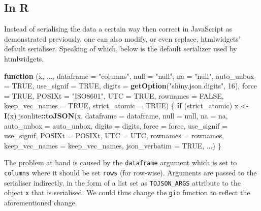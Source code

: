 \documentclass[
]{krantz}
\makeatletter
\newenvironment{Shaded}{\begin{snugshade}}{\end{snugshade}}
\newcommand{\ControlFlowTok}[1]{\textcolor[rgb]{0.27,0.27,0.27}{\textbf{#1}}}
\newcommand{\DataTypeTok}[1]{\textcolor[rgb]{0.27,0.27,0.27}{#1}}
\newcommand{\DecValTok}[1]{\textcolor[rgb]{0.06,0.06,0.06}{#1}}
\newcommand{\KeywordTok}[1]{\textcolor[rgb]{0.27,0.27,0.27}{\textbf{#1}}}
\newcommand{\NormalTok}[1]{#1}
\newcommand{\OperatorTok}[1]{\textcolor[rgb]{0.43,0.43,0.43}{\textbf{#1}}}
\newcommand{\OtherTok}[1]{\textcolor[rgb]{0.37,0.37,0.37}{#1}}
\newcommand{\StringTok}[1]{\textcolor[rgb]{0.5,0.5,0.5}{#1}}
\newenvironment{kframe}{%
\medskip{}
\setlength{\fboxsep}{.8em}
 \def\at@end@of@kframe{}%
 \ifinner\ifhmode%
  \def\at@end@of@kframe{\end{minipage}}%
  \begin{minipage}{\columnwidth}%
 \fi\fi%
 \def\FrameCommand##1{\hskip\@totalleftmargin \hskip-\fboxsep
 \colorbox{shadecolor}{##1}\hskip-\fboxsep
     \hskip-\linewidth \hskip-\@totalleftmargin \hskip\columnwidth}%
 \MakeFramed {\advance\hsize-\width
   \@totalleftmargin\z@ \linewidth\hsize
   \@setminipage}}%
 {\par\unskip\endMakeFramed%
 \at@end@of@kframe}
\renewenvironment{Shaded}{\begin{kframe}}{\end{kframe}}
\makeatother
\begin{document}
\hypertarget{in-r}{%
\subsection{In R}\label{in-r}}

Instead of serialising the data a certain way then correct in JavaScript as demonstrated previously, one can also modify, or even replace, htmlwidgets' default serialiser. Speaking of which, below is the default serializer used by htmlwidgets.

\begin{Shaded}
\begin{Highlighting}[]
\ControlFlowTok{function}\NormalTok{ (x, ..., }\DataTypeTok{dataframe =} \StringTok{"columns"}\NormalTok{, }\DataTypeTok{null =} \StringTok{"null"}\NormalTok{, }
\DataTypeTok{na =} \StringTok{"null"}\NormalTok{, }\DataTypeTok{auto\_unbox =} \OtherTok{TRUE}\NormalTok{, }\DataTypeTok{use\_signif =} \OtherTok{TRUE}\NormalTok{, }
  \DataTypeTok{digits =} \KeywordTok{getOption}\NormalTok{(}\StringTok{"shiny.json.digits"}\NormalTok{, }\DecValTok{16}\NormalTok{), }\DataTypeTok{force =} \OtherTok{TRUE}\NormalTok{,}
  \DataTypeTok{POSIXt =} \StringTok{"ISO8601"}\NormalTok{, }\DataTypeTok{UTC =} \OtherTok{TRUE}\NormalTok{, }\DataTypeTok{rownames =} \OtherTok{FALSE}\NormalTok{, }
  \DataTypeTok{keep\_vec\_names =} \OtherTok{TRUE}\NormalTok{, }\DataTypeTok{strict\_atomic =} \OtherTok{TRUE}\NormalTok{) }
\NormalTok{\{}
  \ControlFlowTok{if}\NormalTok{ (strict\_atomic) }
\NormalTok{      x <{-}}\StringTok{ }\KeywordTok{I}\NormalTok{(x)}
\NormalTok{  jsonlite}\OperatorTok{::}\KeywordTok{toJSON}\NormalTok{(x, }\DataTypeTok{dataframe =}\NormalTok{ dataframe, }\DataTypeTok{null =}\NormalTok{ null, }\DataTypeTok{na =}\NormalTok{ na, }
    \DataTypeTok{auto\_unbox =}\NormalTok{ auto\_unbox, }\DataTypeTok{digits =}\NormalTok{ digits, }\DataTypeTok{force =}\NormalTok{ force, }
    \DataTypeTok{use\_signif =}\NormalTok{ use\_signif, }\DataTypeTok{POSIXt =}\NormalTok{ POSIXt, }\DataTypeTok{UTC =}\NormalTok{ UTC, }
    \DataTypeTok{rownames =}\NormalTok{ rownames, }\DataTypeTok{keep\_vec\_names =}\NormalTok{ keep\_vec\_names, }
    \DataTypeTok{json\_verbatim =} \OtherTok{TRUE}\NormalTok{, ...)}
\NormalTok{\}}
\end{Highlighting}
\end{Shaded}

The problem at hand is caused by the \texttt{dataframe} argument which is set to \texttt{columns} where it should be set \texttt{rows} (for row-wise). Arguments are passed to the serialiser indirectly, in the form of a list set as \texttt{TOJSON\_ARGS} attribute to the object \texttt{x} that is serialised. We could thus change the \texttt{gio} function to reflect the aforementioned change.
\end{document}
